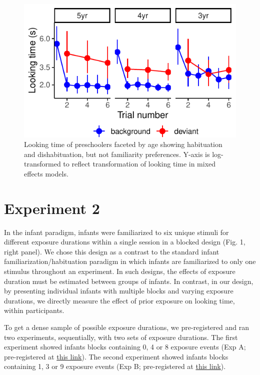 \documentclass[10pt, letterpaper]{article}
\newenvironment{CodeChunk}{}{}
\begin{document}
\begin{CodeChunk}
\begin{figure}[t!]

\includegraphics{figs/unnamed-chunk-13-1} \hfill{}

\caption[Looking time of preschoolers faceted by age showing habituation and dishabituation, but not familiarity preferences]{Looking time of preschoolers faceted by age showing habituation and dishabituation, but not familiarity preferences. Y-axis is log-transformed to reflect transformation of looking time in mixed effects models.}\label{fig:unnamed-chunk-13}
\end{figure}
\end{CodeChunk}

\hypertarget{experiment-2}{%
\section{Experiment 2}\label{experiment-2}}

In the infant paradigm, infants were familiarized to six unique stimuli
for different exposure durations within a single session in a blocked
design (Fig. 1, right panel). We chose this design as a contrast to the
standard infant familiarization/habituation paradigm in which infants
are familiarized to only one stimulus throughout an experiment. In such
designs, the effects of exposure duration must be estimated between
groups of infants. In contrast, in our design, by presenting individual
infants with multiple blocks and varying exposure durations, we directly
measure the effect of prior exposure on looking time, within
participants.

To get a dense sample of possible exposure durations, we pre-registered
and ran two experiments, sequentially, with two sets of exposure
durations. The first experiment showed infants blocks containing 0, 4 or
8 exposure events (Exp A; pre-registered at
\href{https://osf.io/gux4f/?view_only=b4d6d0118dfa41a79fb431d389f4fecc}{this
link}). The second experiment showed infants blocks containing 1, 3 or 9
exposure events (Exp B; pre-registered at
\href{https://osf.io/w6pgu/?view_only=39ee108159884761a0c5bc68d11918df}{this
link}).
\end{document}
